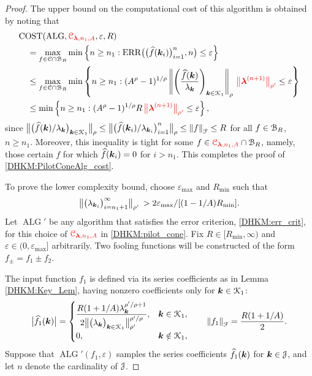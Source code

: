 \documentclass[USenglish]{article}
\theoremstyle{dgthm}
\theoremstyle{dgthm}
\theoremstyle{dgthm}
\theoremstyle{dgthm}
\theoremstyle{dgdef}
\theoremstyle{definition}
\DeclareMathOperator{\ALG}{ALG}
\DeclareMathOperator{\ERR}{ERR}
\newcommand{\dataN}{\bigl(\hf(\bsk_i)\bigr)_{i=1}^n}
\newcommand{\ERRN}{\ERR\bigl(\dataN,n\bigr)}
\DeclareMathOperator{\COST}{COST}
\newcommand{\hf}{\widehat{f}}
\newcommand{\bigabs}[1]{\ensuremath{\bigl \lvert #1 \bigr \rvert}}
\newcommand{\norm}[2][{}]{\ensuremath{\left \lVert #2 \right \rVert}_{#1}}
\newcommand{\bignorm}[2][{}]{\ensuremath{\bigl \lVert #2 \bigr \rVert}_{#1}}
\newcommand{\DHKMchange}[1]{{\color{red}{#1}}}
\begin{document}
\begin{proof} 
The upper bound on the computational cost of this algorithm is obtained by noting that 
\begin{align*}
    \MoveEqLeft[1]{\COST(\ALG,\DHKMchange{\calC_{\boldsymbol{\lambda},n_1,A}},\varepsilon,R)} \\
    & = \max_{f \in \calC \cap \calB_{R}} \min \left \{n \ge n_1 : \ERRN \le \varepsilon \right \} \\
     & \le \max_{f \in \calC \cap \calB_{R}} \min \left \{n \ge n_1 : 
     (A^\rho -1)^{1/\rho} \norm[\rho]{\left( \frac{\hf(\bsk)}{\lambda_{\bsk}} \right)_{\bsk \in \calK_1 }} \, 
     \DHKMchange{\bignorm[\rho']{\bslambda^{(n+1)}}}
    \le \varepsilon \right \} \\   
     & \le \min \left \{n \ge n_1 : 
     (A^\rho -1)^{1/\rho} R \, \DHKMchange{\bignorm[\rho']{\bslambda^{(n+1)}}}
    \le \varepsilon \right \},  
\end{align*}
since $\bignorm[\rho]{\bigl( \hf(\bsk)/\lambda_{\bsk} \bigr)_{\bsk \in \calK_1}} \le \bignorm[\rho]{\bigl( \hf(\bsk_i)/\lambda_{\bsk_i} \bigr)_{i=1}^{n}} \le  \norm[\calF]{f} \le R$ for all $f \in {\mathcal{B}}_R$, $n \ge n_1$.  Moreover, this inequality is tight for some $f \in \DHKMchange{\calC_{\boldsymbol{\lambda},n_1,A}} \cap \calB_{R}$, namely, those certain $f$ for which $\hf(\bsk_i) = 0$ for $i > n_1$.  This completes the proof of \eqref{DHKM:PilotConeAlg_cost}.

To prove the lower complexity bound, choose $\varepsilon_{\max}$ and $R_{\min}$ such that 
\[
\bignorm[\rho']{\bigl(  \lambda_{\bsk_i}  \bigr)_{i = n_1+1}^{\infty}} \,
    > 2\varepsilon_{\max}/[(1 - 1/A) R_{\min}].
    \]
Let $\ALG'$ be any algorithm that satisfies the error criterion, \eqref{DHKM:err_crit}, for this choice of $\DHKMchange{\calC_{\boldsymbol{\lambda},n_1,A}}$ in \eqref{DHKM:pilot_cone}.   Fix $R \in [R_{\min},\infty)$ and $\varepsilon \in (0,\varepsilon_{\max}]$ arbitrarily.  Two fooling functions will be constructed of the form $f_\pm = f_1 \pm f_2$.  

The input function $f_1$ is defined via its series coefficients as in Lemma \ref{DHKM:Key_Lem}, having nonzero coefficients only for ${\boldsymbol{k}} \in {\mathcal{K}}_1$:
\begin{equation*}
    \bigabs{\hf_1(\bsk)} = \begin{cases} \displaystyle \frac{R (1+1/A) \lambda_{\bsk}^{\rho'/\rho + 1}}{2\bignorm[\rho']{\bigl(  \lambda_{\bsk}  \bigr)_{\bsk \in \calK_1}}^{\rho'/\rho}}, &  \bsk \in \calK_1, \\
    0, & \bsk \notin \calK_1,
    \end{cases}
   \qquad \norm[\calF]{f_1} = \frac{R(1 + 1/A)}{2}.
\end{equation*}
Suppose that $\ALG'(f_1,\varepsilon)$ samples the series coefficients $\hf_1(\bsk)$ for ${\boldsymbol{k}} \in {\mathcal{J}}$, and let $n$ denote the cardinality of ${\mathcal{J}}$.  


\end{proof}
\end{document}
